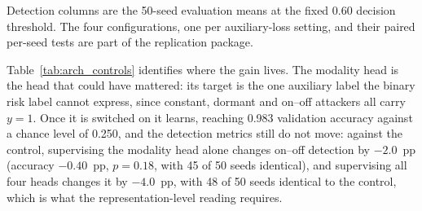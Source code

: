 \documentclass[notspecified,article,submit,moreauthors]{Definitions/mdpi}
\begin{document}
\begin{table}[!htbp]
  \centering
  \caption{Four-arm architecture control. All arms share the encoder, the 18-dimensional input, the optimiser, the 12-seed validation split and the early-stopping rule; only the auxiliary loss terms differ. The modality column reports the accuracy of the four-class attack-modality head on the validation seeds; a head whose loss weight is zero receives no gradient and stays at its initialisation, which the chance level of 0.250 exposes. Every row is a configuration of the proposed model, so bold marks the best value in the column, which is not always the published configuration.}
  \label{tab:arch_controls}
  \footnotesize
  \setlength{\tabcolsep}{2.5pt}
  \renewcommand{\arraystretch}{1.15}
\par
\vspace{2pt}
\raggedright\scriptsize
Detection columns are the 50-seed evaluation means at the fixed 0.60 decision threshold. The four configurations, one per auxiliary-loss setting, and their paired per-seed tests are part of the replication package.
\end{table}

Table~\ref{tab:arch_controls} identifies where the gain lives. The modality head is the head that could have mattered: its target is the one auxiliary label the binary risk label cannot express, since constant, dormant and on--off attackers all carry $y=1$. Once it is switched on it learns, reaching 0.983 validation accuracy against a chance level of 0.250, and the detection metrics still do not move: against the control, supervising the modality head alone changes on--off detection by $-2.0$~pp (accuracy $-0.40$~pp, $p=0.18$, with 45 of 50 seeds identical), and supervising all four heads changes it by $-4.0$~pp, with 48 of 50 seeds identical to the control, which is what the representation-level reading requires.
\end{document}
